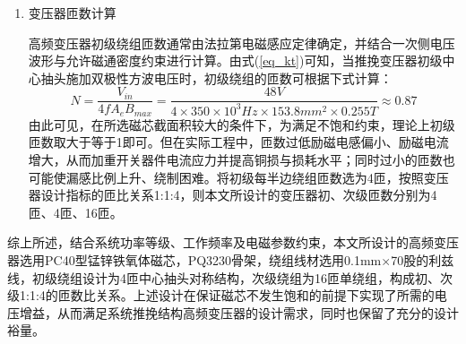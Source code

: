 \begin{enumerate}[topsep = 0 pt, itemsep= 0 pt, parsep=0pt, partopsep=0pt, leftmargin=0pt, itemindent=44pt, labelsep=6pt, listparindent=24pt, label=(\arabic*)]
	      趋肤效应的定量表征通常采用趋肤深度$\delta$，电流在导体内有效流动的深度称为趋肤深度，当导体半径大于趋肤深度时，趋肤效应的作用明显，且随着导体的半径增加，导体交/直流电阻的比值呈指数增加。本文选取常见的铜导线，铜的电阻率$\rho = 1.678 \times 10^{-8} \Omega \cdot m$，磁导率$\mu = 1.2566 \times 10^{-6} H/m$，趋肤深度可根据式(\ref{eq_skin})计算：
	      \begin{equation}
		      \delta = \sqrt{\frac{\rho}{\pi f \mu}} = \sqrt{\frac{1.678 \times 10^{-8} \Omega \cdot m}{\pi \times 350 \times 10^3 \times 1.2566 \times 10^{-6}H/m}} \approx 0.11mm \label{eq_skin}
	      \end{equation}
	      为使单根导体半径不超过趋肤深度，应满足导体的线径不超过$2\delta = 0.22mm$。常见的变压器绕组线材有漆包圆铜线、利兹线、扁铜线以及铜箔绕组等，其中利兹线特别适用于高频变压器场合。利兹线是一种由多股细导线分别绝缘后按照特定规律绞合形成的导线结构，通过减小单股导线直径，并在绞合过程中周期性交换导线位置，可有效降低趋肤效应和邻近效应引起的交流损耗。本文选用单股直径为0.1mm的利兹线作为绕组线材，此时单股导线的截面积为$\pi \times (0.1mm/2)^2 = 0.00785mm^2$。由式(\ref{eq_wire})可知，为了使导线总截面积不小于0.6709mm²，所需最小股数为$\frac{0.6709mm^2}{0.00785mm^2} \approx 86$股导线，在此基础上考虑电流裕量和温升控制，选取规格为0.1mm$\times$90股的利兹线作为变压器绕组材料。

	\item 变压器匝数计算

	      高频变压器初级绕组匝数通常由法拉第电磁感应定律确定，并结合一次侧电压波形与允许磁通密度约束进行计算。由式(\ref{eq_kt})可知，当推挽变压器初级中心抽头施加双极性方波电压时，初级绕组的匝数可根据下式计算：
	      \begin{equation}
		      N = \frac{V_{in}}{4fA_eB_{max}} = \frac{48V}{4 \times 350 \times 10^3Hz \times 153.8mm^2 \times 0.255T} \approx 0.87 \label{eq_turns}
	      \end{equation}
	      由此可见，在所选磁芯截面积较大的条件下，为满足不饱和约束，理论上初级匝数取大于等于1即可。但在实际工程中，匝数过低励磁电感偏小、励磁电流增大，从而加重开关器件电流应力并提高铜损与损耗水平；同时过小的匝数也可能使漏感比例上升、绕制困难。将初级每半边绕组匝数选为4匝，按照变压器设计指标的匝比关系1:1:4，则本文所设计的变压器初、次级匝数分别为4匝、4匝、16匝。
\end{enumerate}

综上所述，结合系统功率等级、工作频率及电磁参数约束，本文所设计的高频变压器选用PC40型锰锌铁氧体磁芯，PQ3230骨架，绕组线材选用0.1mm$\times$70股的利兹线，初级绕组设计为4匝中心抽头对称结构，次级绕组为16匝单绕组，构成初、次级1:1:4的匝数比关系。上述设计在保证磁芯不发生饱和的前提下实现了所需的电压增益，从而满足系统推挽结构高频变压器的设计需求，同时也保留了充分的设计裕量。

